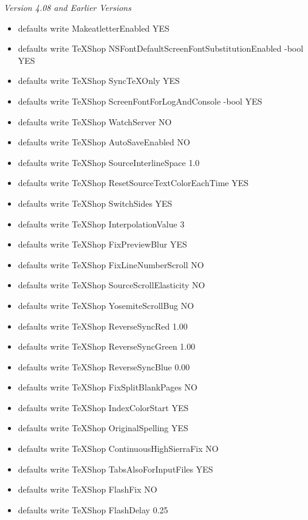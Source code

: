 \documentclass[11pt, oneside]{article}   	%
\begin{document}
\vspace{.3in}
{\em Version 4.08 and Earlier Versions}
\begin{itemize}
\item defaults write MakeatletterEnabled YES
\item defaults write TeXShop NSFontDefaultScreenFontSubstitutionEnabled -bool YES
\item defaults write TeXShop SyncTeXOnly YES
\item defaults write TeXShop ScreenFontForLogAndConsole -bool YES
\item defaults write TeXShop WatchServer NO
\item defaults write TeXShop AutoSaveEnabled NO
\item defaults write TeXShop SourceInterlineSpace 1.0
\item defaults write TeXShop ResetSourceTextColorEachTime YES
\item defaults write TeXShop SwitchSides YES
\item defaults write TeXShop InterpolationValue 3
\item defaults write TeXShop FixPreviewBlur YES
\item defaults write TeXShop FixLineNumberScroll NO
\item defaults write TeXShop SourceScrollElasticity NO
\item defaults write TeXShop YosemiteScrollBug NO
\item defaults write TeXShop ReverseSyncRed 1.00 
\item defaults write TeXShop ReverseSyncGreen 1.00 
\item defaults write TeXShop ReverseSyncBlue 0.00
\item defaults write TeXShop FixSplitBlankPages NO
\item defaults write TeXShop IndexColorStart YES
\item defaults write TeXShop OriginalSpelling YES
\item defaults write TeXShop ContinuousHighSierraFix NO
\item defaults write TeXShop TabsAlsoForInputFiles YES
\item defaults write TeXShop FlashFix NO
\item defaults write TeXShop FlashDelay 0.25
\end{itemize}
\end{document}
